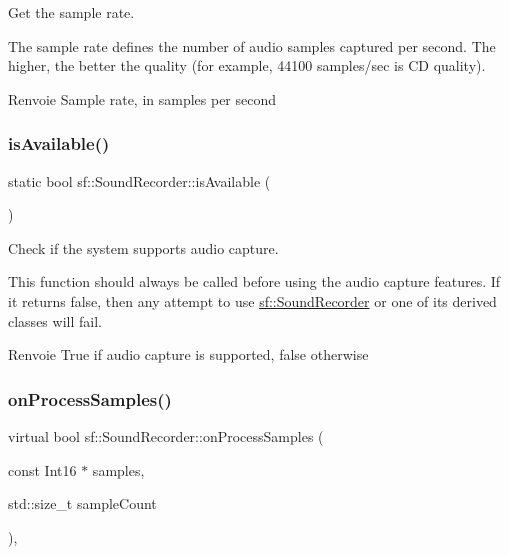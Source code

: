 Get the sample rate. 

The sample rate defines the number of audio samples captured per second. The higher, the better the quality (for example, 44100 samples/sec is CD quality).

\begin{DoxyReturn}{Renvoie}
Sample rate, in samples per second 
\end{DoxyReturn}
\mbox{\label{classsf_1_1SoundRecorder_aab2bd0fee9e48d6cfd449b1cb078ce5a}} 
\subsubsection{\texorpdfstring{is\+Available()}{isAvailable()}}
{\footnotesize\ttfamily static bool sf\+::\+Sound\+Recorder\+::is\+Available (\begin{DoxyParamCaption}{ }\end{DoxyParamCaption})\hspace{0.3cm}{\ttfamily [static]}}



Check if the system supports audio capture. 

This function should always be called before using the audio capture features. If it returns false, then any attempt to use \hyperlink{classsf_1_1SoundRecorder}{sf\+::\+Sound\+Recorder} or one of its derived classes will fail.

\begin{DoxyReturn}{Renvoie}
True if audio capture is supported, false otherwise 
\end{DoxyReturn}
\mbox{\label{classsf_1_1SoundRecorder_a2670124cbe7a87c7e46b4840807f4fd7}} 
\subsubsection{\texorpdfstring{on\+Process\+Samples()}{onProcessSamples()}}
{\footnotesize\ttfamily virtual bool sf\+::\+Sound\+Recorder\+::on\+Process\+Samples (\begin{DoxyParamCaption}\item[{const Int16 $\ast$}]{samples,  }\item[{std\+::size\+\_\+t}]{sample\+Count }\end{DoxyParamCaption})\hspace{0.3cm}{\ttfamily [protected]}, {}}



